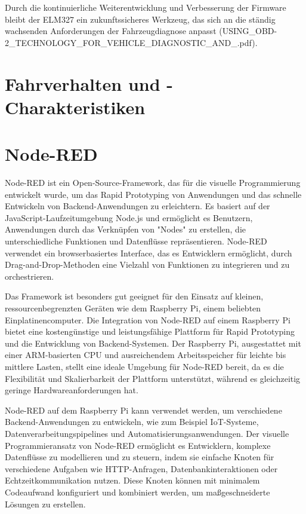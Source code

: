 \documentclass[oneside]{ausarbeitung}
\begin{document}
Durch die kontinuierliche Weiterentwicklung und Verbesserung der Firmware bleibt der ELM327 ein zukunftssicheres Werkzeug, das sich an die ständig wachsenden Anforderungen der Fahrzeugdiagnose anpasst (USING\_OBD-2\_TECHNOLOGY\_FOR\_VEHICLE\_DIAGNOSTIC\_AND\_.pdf).

\section{Fahrverhalten und -Charakteristiken}
\label{sec:foundations_fahrverhalten}

\section{Node-RED}
\label{sec:foundations_nodered}
Node-RED ist ein Open-Source-Framework, das für die visuelle Programmierung entwickelt wurde, um das Rapid Prototyping von Anwendungen und das schnelle Entwickeln von Backend-Anwendungen zu erleichtern. Es basiert auf der JavaScript-Laufzeitumgebung Node.js und ermöglicht es Benutzern, Anwendungen durch das Verknüpfen von "Nodes" zu erstellen, die unterschiedliche Funktionen und Datenflüsse repräsentieren. Node-RED verwendet ein browserbasiertes Interface, das es Entwicklern ermöglicht, durch Drag-and-Drop-Methoden eine Vielzahl von Funktionen zu integrieren und zu orchestrieren.

Das Framework ist besonders gut geeignet für den Einsatz auf kleinen, ressourcenbegrenzten Geräten wie dem Raspberry Pi, einem beliebten Einplatinencomputer. Die Integration von Node-RED auf einem Raspberry Pi bietet eine kostengünstige und leistungsfähige Plattform für Rapid Prototyping und die Entwicklung von Backend-Systemen. Der Raspberry Pi, ausgestattet mit einer ARM-basierten CPU und ausreichendem Arbeitsspeicher für leichte bis mittlere Lasten, stellt eine ideale Umgebung für Node-RED bereit, da es die Flexibilität und Skalierbarkeit der Plattform unterstützt, während es gleichzeitig geringe Hardwareanforderungen hat.

Node-RED auf dem Raspberry Pi kann verwendet werden, um verschiedene Backend-Anwendungen zu entwickeln, wie zum Beispiel IoT-Systeme, Datenverarbeitungspipelines und Automatisierungsanwendungen. Der visuelle Programmieransatz von Node-RED ermöglicht es Entwicklern, komplexe Datenflüsse zu modellieren und zu steuern, indem sie einfache Knoten für verschiedene Aufgaben wie HTTP-Anfragen, Datenbankinteraktionen oder Echtzeitkommunikation nutzen. Diese Knoten können mit minimalem Codeaufwand konfiguriert und kombiniert werden, um maßgeschneiderte Lösungen zu erstellen.
\end{document}
